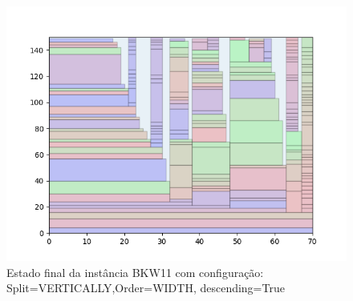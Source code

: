 \begin{figure}[H]
    \centering
    \caption[]{Estado final da instância BKW11 com configuração: Split=VERTICALLY,Order=WIDTH, descending=True}
    \label{fig:bkw11-vertically-width-true}
    \includegraphics[scale=0.5]{output/figures/bkw/bkw11/vertically/width/true/000}
\end{figure}